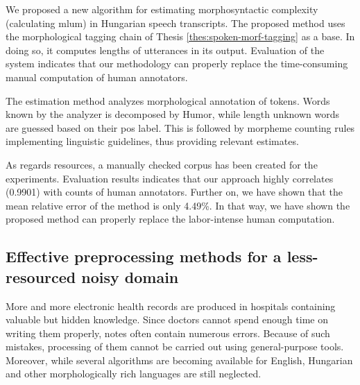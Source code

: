\begin{core}
\begin{thesis}
\label{thes:mlu-estimation}
We proposed a new algorithm for estimating morphosyntactic complexity (calculating \acrlong{mlum}) in Hungarian speech transcripts.
The proposed method uses the morphological tagging chain of Thesis \ref{thes:spoken-morf-tagging} as a base.
In doing so, it computes lengths of utterances in its output.
Evaluation of the system indicates that our methodology can properly replace the time-consuming manual computation of human annotators.
\end{thesis}

\begin{pub}
\cite{Matyus2014,Orosz2014c}
\end{pub}
\end{core}

The estimation method analyzes morphological annotation of tokens.
Words known by the analyzer is decomposed by Humor, while length unknown words are guessed based on their \acrshort{pos} label.
This is followed by morpheme counting rules implementing linguistic guidelines, thus providing relevant estimates.

As regards resources, a manually checked corpus has been created for the experiments.
Evaluation results indicates that our approach highly correlates (0.9901) with counts of human annotators.
Further on, we have shown that the mean relative error of the method is only 4.49\%.
In that way, we have shown the proposed method can properly replace the labor-intense human computation.

\subsection{Effective preprocessing methods for a less-resourced noisy domain}
\label{thes:clin}

More and more electronic health records are produced in hospitals containing valuable but hidden knowledge.
Since doctors cannot spend enough time on writing them properly, notes often contain numerous errors.
Because of such mistakes, processing of them cannot be carried out using general-purpose tools.
Moreover, while several algorithms are becoming available for English, Hungarian and other morphologically rich languages are still neglected.

